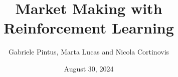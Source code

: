 \documentclass{beamer}
\title[Market Making with RL]{Market Making with Reinforcement Learning}
\author[G. Pintus, M. Lucas, N. Cortinovis]{Gabriele Pintus, Marta Lucas and Nicola Cortinovis}
\institute[]
{University of Trieste}
\date{August 30, 2024}
\begin{document}
\frame{\titlepage}
\end{document}
